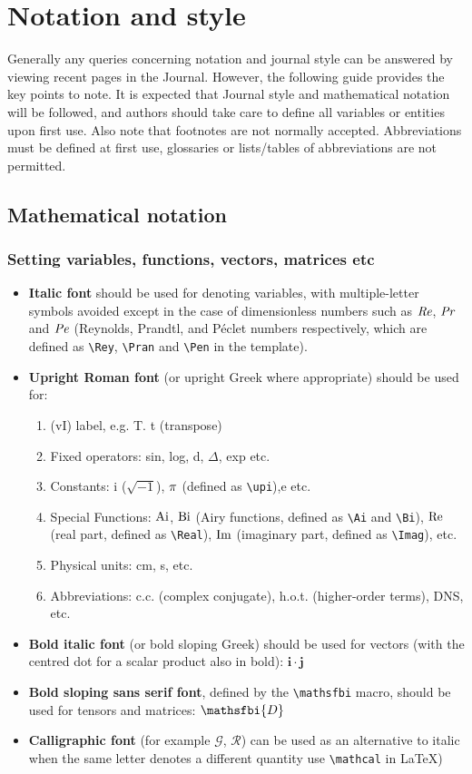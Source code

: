 \documentclass[lineno]{JFM-FLM_Au}
\begin{document}
\section{Notation and style}\label{notstyle}
 Generally any queries concerning notation and journal style can be answered by viewing recent pages in the Journal. However, the following guide provides the key points to note. It is expected that Journal style and mathematical notation will be followed, and authors should take care to define all variables or entities upon first use. Also note that footnotes are not normally accepted.  Abbreviations must be defined at first use, glossaries or lists/tables of abbreviations are not permitted.

\subsection{Mathematical notation}
\subsubsection{Setting variables, functions, vectors, matrices etc}
\begin{itemize} \label{sec:MathNot}
\item {\bf Italic font} should be used for denoting variables, with multiple-letter symbols avoided except in the case of dimensionless numbers such as $\mbox{\textit{Re}}$, $\mbox{\textit{Pr}}$ and $\mbox{\textit{Pe}}$ (Reynolds, Prandtl, and P\'eclet numbers respectively, which are defined as \verb}\Rey}, \verb}\Pran} and \verb}\Pen} in the template).
\item {\bf Upright Roman font} (or upright Greek where appropriate) should be used for:
\begin{enumerate}%
\item (vI) label, e.g.  T. t (transpose)
\item Fixed operators: sin, log, d, $\Delta$, exp etc.
\item Constants: i ($\sqrt{-1}$), $\pi$ (defined as \verb}\upi}),e  etc.
\item Special Functions: $\mbox{Ai}$, $\mbox{Bi}$ (Airy functions, defined as \verb}\Ai} and \verb}\Bi}), $\mbox{Re}$ (real part, defined as \verb}\Real}), $\mbox{Im}$ (imaginary part, defined as \verb}\Imag}), etc.
\item Physical units: cm, s, etc.
\item Abbreviations: c.c. (complex conjugate), h.o.t. (higher-order terms), DNS, etc.
\end{enumerate}
\item {\bf Bold italic font} (or bold sloping Greek) should be used for vectors (with the centred dot for a scalar product also in bold): $\boldsymbol{i \cdot j}$
\item {\bf Bold sloping sans serif font}, defined by the \verb}\mathsfbi} macro, should be used for tensors and matrices: $\mathsfbi{D}$
\item {\bf Calligraphic font} (for example $\mathcal{G}$, $\mathcal{R}$) can be used as an alternative to italic when the same letter denotes a different quantity use \verb}\mathcal} in \LaTeX)
\end{itemize}
\end{document}
